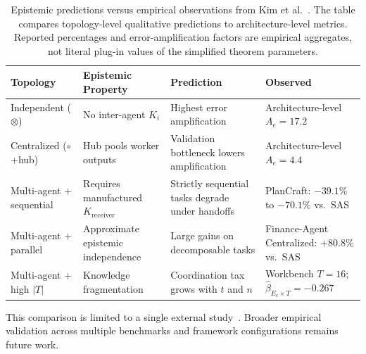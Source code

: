 \begin{table}[h]
\centering
\small
\begin{tabular}{@{}>{\raggedright\arraybackslash}p{}>{\raggedright\arraybackslash}p{}>{\raggedright\arraybackslash}p{}>{\raggedright\arraybackslash}p{}@{}}
\toprule
\textbf{Topology} & \textbf{Epistemic Property} & \textbf{Prediction} & \textbf{Observed} \\
\midrule
Independent ($\otimes$) & No inter-agent $K_i$ & Highest error amplification & Architecture-level $A_e = 17.2$ \\
Centralized ($\circ$+hub) & Hub pools worker outputs & Validation bottleneck lowers amplification & Architecture-level $A_e = 4.4$ \\
Multi-agent + sequential & Requires manufactured $K_{\mathrm{receiver}}$ & Strictly sequential tasks degrade under handoffs & PlanCraft: $-39.1\%$ to $-70.1\%$ vs.\ SAS \\
Multi-agent + parallel & Approximate epistemic independence & Large gains on decomposable tasks & Finance-Agent Centralized: $+80.8\%$ vs.\ SAS \\
Multi-agent + high $|T|$ & Knowledge fragmentation & Coordination tax grows with $t$ and $n$ & Workbench $T=16$; $\hat{\beta}_{E_c \times T} = -0.267$ \\
\bottomrule
\end{tabular}
\caption{Epistemic predictions versus empirical observations from Kim et al.~\cite{kim2025scaling}. The
table compares topology-level qualitative predictions to architecture-level metrics. Reported
percentages and error-amplification factors are empirical aggregates, not literal plug-in values of the
simplified theorem parameters.}
\label{tab:epistemic-predictions}
\end{table}

This comparison is limited to a single external study~\cite{kim2025scaling}.
Broader empirical validation across multiple benchmarks and framework
configurations remains future work.
